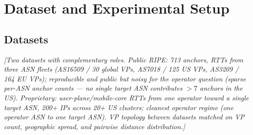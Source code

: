 \section{Dataset and Experimental Setup}
\label{sec:setup}

%
%
%
%

\subsection{Datasets}
\label{sec:setup-datasets}
\textit{[Two datasets with complementary roles.
Public RIPE: 713 anchors, RTTs from three ASN fleets (AS16509 / 30 global VPs, AS7018 / 125 US VPs,
AS3209 / 164 EU VPs); reproducible and public but noisy for the operator question (sparse per-ASN
anchor counts — no single target ASN contributes $>7$ anchors in the US).
Proprietary: user-plane/mobile-core RTTs from one operator toward a single target ASN,
200+ IPs across 20+ US clusters; cleanest operator regime (one operator ASN to one target ASN).
VP topology between datasets matched on VP count, geographic spread, and pairwise distance distribution.]}

